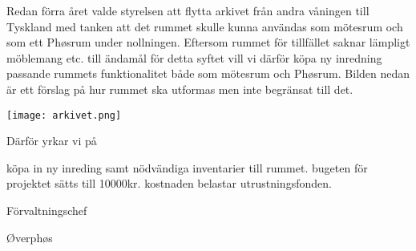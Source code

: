 \documentclass[../_main/handlingar.tex]{subfiles}
\begin{document}

Redan förra året valde styrelsen att flytta arkivet från andra våningen till Tyskland med tanken att det rummet skulle kunna användas som mötesrum och som ett Phøsrum under nollningen. Eftersom rummet för tillfället saknar lämpligt möblemang etc. till ändamål för detta syftet vill vi därför köpa ny inredning passande rummets funktionalitet både som mötesrum och Phøsrum. Bilden nedan är ett förslag på hur rummet ska utformas men inte begränsat till det.

\begin{center}
\texttt{[image: arkivet.png]}
\end{center}

Därför yrkar vi på
\begin{attsatser}
    \att köpa in ny inreding samt nödvändiga inventarier till rummet.
    \att bugeten för projektet sätts till 10000kr.
    \att kostnaden belastar utrustningsfonden.
\end{attsatser}

\begin{signatures}{2}
    \ist
    \signature{Anders Nilsson}{Förvaltningschef}
    \signature{Molly Rusk}{Øverphøs}
\end{signatures}
\end{document}
